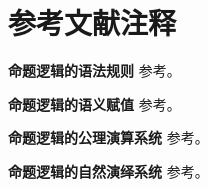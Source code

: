 \section{参考文献注释}

\textbf{命题逻辑的语法规则} 参考\textcite[2.2 语言]{mathematical_logic_1}。

\textbf{命题逻辑的语义赋值} 参考\textcite[1.3 命题演算的语义]{mathematical_logic_2}。

\textbf{命题逻辑的公理演算系统} 参考\textcite[1.2 命题演算的建立]{mathematical_logic_2}。

\textbf{命题逻辑的自然演绎系统} 参考\textcite[2.4 Natural Deduction]{mathematical_logic_and_computation}。

\newpage